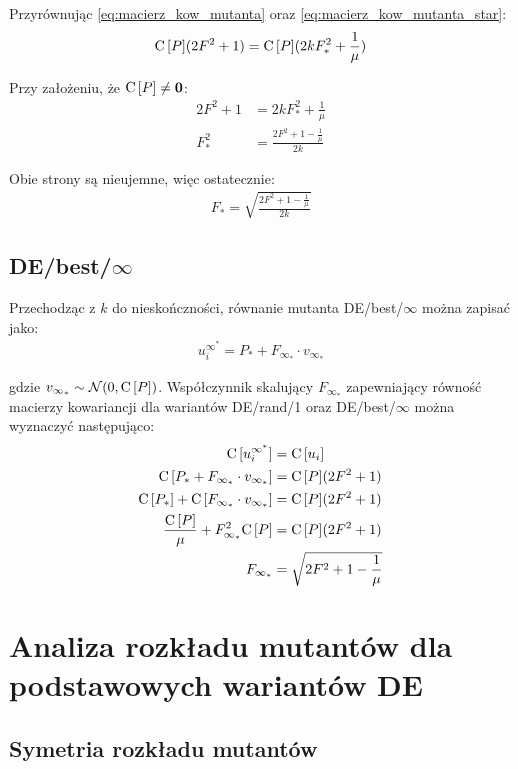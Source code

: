 \documentclass[a4paper,onecolumn,oneside,12pt,wide,floatssmall]{mwrep}
\def\C{{\rm C}\,}
\theoremstyle{definition}
\theoremstyle{plain}%
\theoremstyle{remark}
\begin{document}
Przyrównując \eqref{eq:macierz_kow_mutanta} oraz \eqref{eq:macierz_kow_mutanta_star}:
\begin{align*}
\C[P](2F^2 + 1) = \C[P](2kF_*^2 + \frac{1}{\mu})
\end{align*}

Przy założeniu, że $\C[P] \neq \textbf{0}$:
\begin{align*}
2F^2 + 1 &= 2kF_*^2 + \frac{1}{\mu} \\
F_*^2 &= \frac{2F^2 + 1 - \frac{1}{\mu}}{2k}
\end{align*}

Obie strony są nieujemne, więc ostatecznie:
\begin{align*}
F_* = \sqrt{\frac{2F^2 + 1 - \frac{1}{\mu}}{2k}}
\end{align*}

\subsection{DE/best/$\infty$}
\label{sub:de_rand_inf}

Przechodząc z $k$ do nieskończności, równanie mutanta DE/best/$\infty$ można zapisać jako:
\begin{align*}
u_i^{\infty^*} = P_* + F_{\infty_*} \cdot v_{\infty_*}
\end{align*}

gdzie $v_{\infty_*} \sim \mathcal{N}(0, \C[P])$. Współczynnik skalujący $F_{\infty_*}$ zapewniający
równość macierzy kowariancji dla wariantów DE/rand/1 oraz DE/best/$\infty$
można wyznaczyć następująco:
\begin{align*}
\C[u_i^{\infty^*}] &= \C[u_i] \\
\C[P_* + F_{\infty_*} \cdot v_{\infty_*}] &= \C[P](2F^2 + 1) \\
\C[P_*] + \C[F_{\infty_*} \cdot v_{\infty_*}] &= \C[P](2F^2 + 1) \\
\frac{\C[P]}{\mu} + F_{\infty_*}^2 \C[P] &= \C[P](2F^2 + 1) \\
F_{\infty_*} &= \sqrt{2F^2 + 1 - \frac{1}{\mu}}\\
\end{align*}

\section{Analiza rozkładu mutantów dla podstawowych wariantów DE}

\subsection{Symetria rozkładu mutantów}
\end{document}
